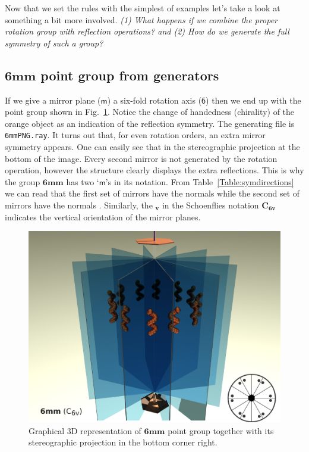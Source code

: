 Now that we set the rules with the simplest of examples let's take a look at something a bit more involved. \textit{(1) What happens if we combine the proper rotation group with reflection operations? and (2) How do we generate the full symmetry of such a group?} 

\subsection{\texorpdfstring{$\mathbf{6mm}$}{6mm} point group from generators}
\label{subChap:pointGroup}
If we give a mirror plane ($\mathsf{m}$) a six-fold rotation axis ($\mathsf{6}$) then we end up with the point group shown in Fig.~\ref{Fig:6mm}. Notice the change of handedness (chirality) of the orange object as an indication of the reflection symmetry. The generating file is \texttt{6mmPNG.ray}. It turns out that, for even rotation orders, an extra mirror symmetry appears. One can easily see that in the stereographic projection at the bottom of the image. Every second mirror is not generated by the rotation operation, however the structure clearly displays the extra reflections. This is why the group $\mathbf{6mm}$ has two `$\mathsf{m}$'s in its notation. From Table~\ref{Table:symdirections} we can read that the first set of mirrors have the normals  while the second set of mirrors have the normals . Similarly, the $_\mathbf{v}$ in the Schoenflies notation $\mathbf{C_{6v}}$ indicates the vertical orientation of the mirror planes.  

\begin{figure}[ht]
    \centering
\includegraphics[width=0.85\linewidth]{Figures/pointGroup.png}
\caption{ Graphical 3D representation of $\mathbf{6mm}$ point group together with its stereographic projection in the bottom corner right. }
\label{Fig:6mm}
\end{figure}





